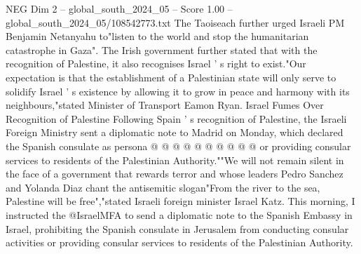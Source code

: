 \begin{textsample}{NEG Dim 2 – global\_south\_2024\_05 – Score 1.00 – global\_south\_2024\_05/108542773.txt}
The Taoiseach further urged Israeli PM Benjamin Netanyahu to"listen to the world and stop the humanitarian catastrophe in Gaza".
The Irish government further stated that with the recognition of Palestine, it also recognises Israel ' s right to exist."Our expectation is that the establishment of a Palestinian state will only serve to solidify Israel ' s existence by allowing it to grow in peace and harmony with its neighbours,"stated Minister of Transport Eamon Ryan.
Israel Fumes Over Recognition of Palestine Following Spain ' s recognition of Palestine, the Israeli Foreign Ministry sent a diplomatic note to Madrid on Monday, which declared the Spanish consulate as persona @ @ @ @ @ @ @ @ @ @ or providing consular services to residents of the Palestinian Authority.""We will not remain silent in the face of a government that rewards terror and whose leaders Pedro Sanchez and Yolanda Diaz chant the antisemitic slogan"From the river to the sea, Palestine will be free","stated Israeli foreign minister Israel Katz.
This morning, I instructed the @IsraelMFA to send a diplomatic note to the Spanish Embassy in Israel, prohibiting the Spanish consulate in Jerusalem from conducting consular activities or providing consular services to residents of the Palestinian Authority.

\end{textsample}
